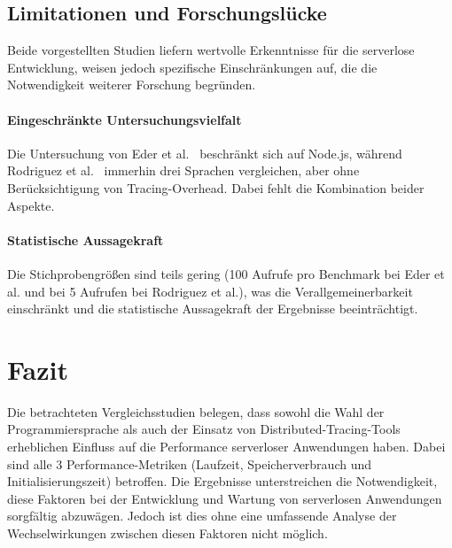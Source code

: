 \subsection{Limitationen und Forschungslücke}
\label{sec:limitations}

Beide vorgestellten Studien liefern wertvolle Erkenntnisse für die serverlose Entwicklung, weisen jedoch spezifische Einschränkungen auf, 
die die Notwendigkeit weiterer Forschung begründen.

\paragraph{Eingeschränkte Untersuchungsvielfalt}
Die Untersuchung von Eder et al.~\cite{10254754} beschränkt sich auf Node.js, während Rodriguez et al.~\cite{Rodriguez2024Evaluation} 
immerhin drei Sprachen vergleichen, aber ohne Berücksichtigung von Tracing-Overhead. Dabei fehlt die Kombination beider Aspekte.

\paragraph{Statistische Aussagekraft}
Die Stichprobengrößen sind teils gering (100 Aufrufe pro Benchmark bei Eder et al. und bei 5 Aufrufen bei Rodriguez et al.), 
was die Verallgemeinerbarkeit einschränkt und die statistische Aussagekraft der Ergebnisse beeinträchtigt.

\section{Fazit}
\label{sec:conclusion-related}

Die betrachteten Vergleichsstudien belegen, dass sowohl die Wahl der Programmiersprache als auch der Einsatz von Distributed-Tracing-Tools 
erheblichen Einfluss auf die Performance serverloser Anwendungen haben. Dabei sind alle 3 Performance-Metriken (Laufzeit, Speicherverbrauch und Initialisierungszeit) betroffen. 
Die Ergebnisse unterstreichen die Notwendigkeit, diese Faktoren bei der Entwicklung und Wartung von serverlosen Anwendungen sorgfältig abzuwägen. 
Jedoch ist dies ohne eine umfassende Analyse der Wechselwirkungen zwischen diesen Faktoren nicht möglich.